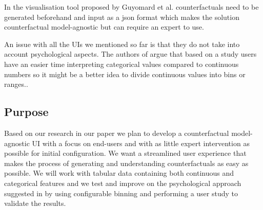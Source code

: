 In the visualisation tool proposed by Guyomard et al. \cite{guyomard2023interactive} counterfactuals need to be generated beforehand and input as a json format which makes the solution counterfactual model-agnostic but can require an expert to use. 

An issue with all the UIs we mentioned so far is that they do not take into account psychological aspects. The authors of \cite{warren2022better} argue that based on a study users have an easier time interpreting categorical values compared to continuous numbers so it might be a better idea to divide continuous values into bins or ranges..

\subsection*{Purpose}
Based on our research in our paper we plan to develop a counterfactual model-agnostic UI with a focus on end-users and with as little expert intervention as possible for initial configuration. We want a streamlined user experience that makes the process of generating and understanding counterfactuals as easy as possible. We will work with tabular data containing both continuous and categorical features and we test and improve on the psychological approach suggested in \cite{warren2022better} by using configurable binning and performing a user study to validate the results.
